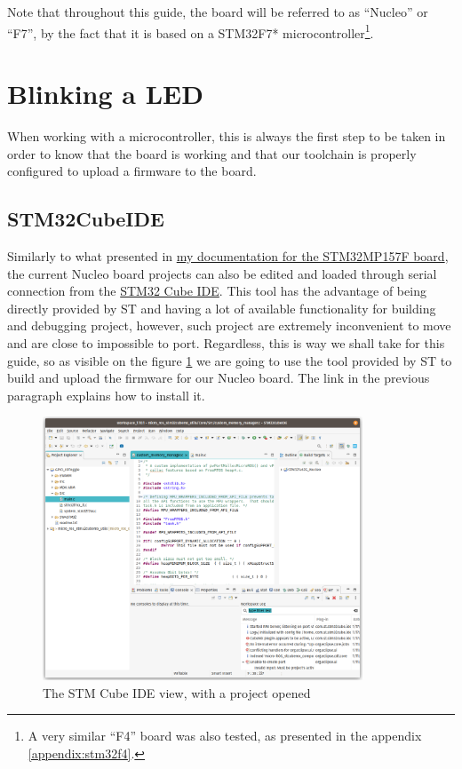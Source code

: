 \documentclass[10pt]{article}
\begin{document}
Note that throughout this guide, the board will be referred to as ``Nucleo'' or ``F7'', by the fact that it is based on a STM32F7* microcontroller\footnote{A very similar ``F4'' board was also tested, as presented in the appendix \ref{appendix:stm32f4}.}.

\section{Blinking a LED}
\label{sec:blinking-led}
When working with a microcontroller, this is always the first step to be taken
in order to know that the board is working and that our toolchain is properly
configured to upload a firmware to the board.

\subsection{STM32CubeIDE}
\label{sec:stm32cubeide}
Similarly to what presented in \href{https://gitlab.com/stm32mp157f-dk2/documentation}{my documentation for the STM32MP157F board}, the current Nucleo board projects can also be edited and loaded through serial connection from the \href{https://www.st.com/en/development-tools/stm32cubeide.html}{STM32 Cube IDE}. This tool has the advantage of being directly provided by ST and having a lot of available functionality for building and debugging project, however, such project are extremely inconvenient to move and are close to impossible to port. Regardless, this is way we shall take for this guide, so as visible on the figure \ref{fig:ide} we are going to use the tool provided by ST to build and upload the firmware for our Nucleo board. The link in the previous paragraph explains how to install it.

\begin{figure}[h]
  \centering
  \includegraphics[width=0.85\textwidth]{./img/ide.png}
  \caption{The STM Cube IDE view, with a project opened}
  \label{fig:ide}
\end{figure}
\end{document}
